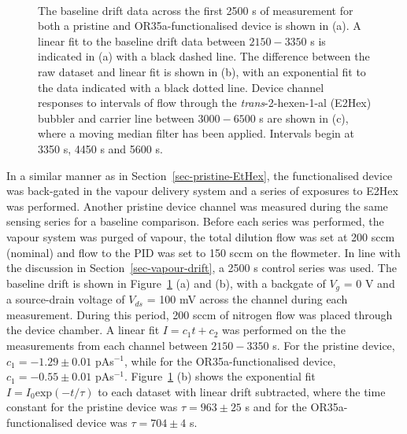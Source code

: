 \documentclass[
  a4paper,
]{scrbook}
\begin{document}
\begin{figure}
\begin{minipage}[t]{0.75\linewidth}
{{}

}

\end{minipage}%
%
\begin{minipage}[t]{0.10\linewidth}

{\centering 

~

}

\end{minipage}%

\caption{\label{fig-E2Hex-sampling}The baseline drift data across the
first 2500 s of measurement for both a pristine and OR35a-functionalised
device is shown in (a). A linear fit to the baseline drift data between
\(2150-3350\) s is indicated in (a) with a black dashed line. The
difference between the raw dataset and linear fit is shown in (b), with
an exponential fit to the data indicated with a black dotted line.
Device channel responses to intervals of flow through the
\emph{trans}-2-hexen-1-al (E2Hex) bubbler and carrier line between
\(3000-6500\) s are shown in (c), where a moving median filter has been
applied. Intervals begin at 3350 s, 4450 s and 5600 s.}

\end{figure}

In a similar manner as in Section~\ref{sec-pristine-EtHex}, the
functionalised device was back-gated in the vapour delivery system and a
series of exposures to E2Hex was performed. Another pristine device
channel was measured during the same sensing series for a baseline
comparison. Before each series was performed, the vapour system was
purged of vapour, the total dilution flow was set at 200 sccm (nominal)
and flow to the PID was set to 150 sccm on the flowmeter. In line with
the discussion in Section~\ref{sec-vapour-drift}, a 2500 s control
series was used. The baseline drift is shown in
Figure~\ref{fig-E2Hex-sampling} (a) and (b), with a backgate of \(V_g\)
= 0 V and a source-drain voltage of \(V_{ds}\) = 100 mV across the
channel during each measurement. During this period, 200 sccm of
nitrogen flow was placed through the device chamber. A linear fit
\(I = c_1t + c_2\) was performed on the the measurements from each
channel between \(2150-3350\) s. For the pristine device,
\(c_1 = -1.29\pm0.01\) pAs\(^{-1}\), while for the OR35a-functionalised
device, \(c_1 = -0.55\pm0.01\) pAs\(^{-1}\).
Figure~\ref{fig-E2Hex-sampling} (b) shows the exponential fit
\(I = I_0\textrm{exp}(-t/\tau)\) to each dataset with linear drift
subtracted, where the time constant for the pristine device was
\(\tau = 963 \pm 25\) s and for the OR35a-functionalised device was
\(\tau = 704 \pm 4\) s.
\end{document}
